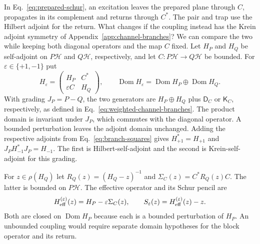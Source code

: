 \documentclass[11pt]{article}
\theoremstyle{definition}
\begin{document}
In Eq.~\eqref{eq:prepared-schur}, an excitation leaves the prepared plane through $C$, propagates in its complement and returns through $C^*$. The pair and trap use the Hilbert adjoint for the return. What changes if the coupling instead has the Krein adjoint symmetry of Appendix~\ref{app:channel-branches}? We can compare the two while keeping both diagonal operators and the map $C$ fixed. Let $H_P$ and $H_Q$ be self-adjoint on $P\mathcal H$ and $Q\mathcal H$, respectively, and let $C:P\mathcal H\to Q\mathcal H$ be bounded. For $\varepsilon\in\{+1,-1\}$ put
\begin{equation}
 H_\varepsilon=
 \begin{pmatrix}H_P&C^*\\ \varepsilon C&H_Q\end{pmatrix},
 \qquad
 \operatorname{Dom}H_\varepsilon=
 \operatorname{Dom}H_P\oplus\operatorname{Dom}H_Q .
 \label{eq:signed-block-generator}
\end{equation}
With grading $J_P=P-Q$, the two generators are $H_P\oplus H_Q$ plus $\mathsf D_C$ or $\mathsf K_C$, respectively, as defined in Eq.~\eqref{eq:weighted-channel-branches}. The product domain is invariant under $J_P$, which commutes with the diagonal operator. A bounded perturbation leaves the adjoint domain unchanged. Adding the respective adjoints from Eq.~\eqref{eq:branch-squares} gives $H_{+1}^*=H_{+1}$ and $J_PH_{-1}^*J_P=H_{-1}$. The first is Hilbert-self-adjoint and the second is Krein-self-adjoint for this grading.

For $z\in\rho(H_Q)$ let $R_Q(z)=(H_Q-z)^{-1}$ and $\Sigma_C(z)=C^*R_Q(z)C$. The latter is bounded on $P\mathcal H$. The effective operator and its Schur pencil are
\begin{equation}
 H_{\rm eff}^{(\varepsilon)}(z)=H_P-\varepsilon\Sigma_C(z),
 \qquad S_\varepsilon(z)=H_{\rm eff}^{(\varepsilon)}(z)-z .
 \label{eq:signed-schur-pencil}
\end{equation}
Both are closed on $\operatorname{Dom}H_P$ because each is a bounded perturbation of $H_P$. An unbounded coupling would require separate domain hypotheses for the block operator and its return.
\end{document}
